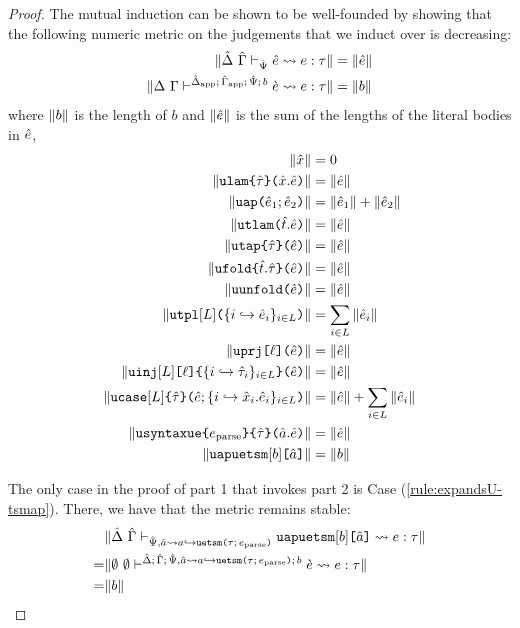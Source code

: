 \begin{proof}
The mutual induction can be shown to be well-founded by showing that the following numeric metric on the judgements that we induct over is decreasing:
\begin{align*}
\sizeof{\expandsU{\uDelta}{\uGamma}{\uPsi}{\ue}{e}{\tau}} & = \sizeof{\ue}\\
\sizeof{\cvalidE{\Delta}{\Gamma}{\esceneU{\uDelta_\text{app}}{\uGamma_\text{app}}{\uPsi}{b}}{\ce}{e}{\tau}} & = \sizeof{b}
\end{align*}
where $\sizeof{b}$ is the length of $b$ and $\sizeof{\ue}$ is the sum of the lengths of the literal bodies in $\ue$,
\begin{align*}
\sizeof{\ux} & = 0\\
\sizeof{\aulam{\utau}{\ux}{\ue}} &= \sizeof{\ue}\\
\sizeof{\auap{\ue_1}{\ue_2}} & = \sizeof{\ue_1} + \sizeof{\ue_2}\\
\sizeof{\autlam{\ut}{\ue}} & = \sizeof{\ue}\\
\sizeof{\autap{\ue}{\utau}} & = \sizeof{\ue}\\
\sizeof{\aufold{\ut}{\utau}{\ue}} & = \sizeof{\ue}\\
\sizeof{\auunfold{\ue}} & = \sizeof{\ue}\\
\sizeof{\autpl{\labelset}{\mapschema{\ue}{i}{\labelset}}} & = \sum_{i \in \labelset} \sizeof{\ue_i}\\
\sizeof{\aupr{\ell}{\ue}} & = \sizeof{\ue}\\
\sizeof{\auin{\labelset}{\ell}{\mapschema{\utau}{i}{\labelset}}{\ue}} & = \sizeof{\ue}\\
\sizeof{\aucase{\labelset}{\utau}{\ue}{\mapschemab{\ux}{\ue}{i}{\labelset}}} & = \sizeof{\ue} + \sum_{i \in \labelset} \sizeof{\ue_i}\\
\sizeof{\audefuetsm{\utau}{\eparse}{\tsmv}{\ue}} & = \sizeof{\ue}\\
\sizeof{\autsmap{b}{\tsmv}} & = \sizeof{b}
\end{align*}

The only case in the proof of part 1 that invokes part 2 is Case (\ref{rule:expandsU-tsmap}). There, we have that the metric remains stable: \begin{align*}
 & \sizeof{\expandsU{\uDelta}{\uGamma}{\uPsi, \uShyp{\tsmv}{a}{\tau}{\eparse}}{\autsmap{b}{\tsmv}}{e}{\tau}}\\
=& \sizeof{\cvalidE{\emptyset}{\emptyset}{\esceneU{\uDelta}{\uGamma}{\uPsi, \uShyp{\tsmv}{a}{\tau}{\eparse}}{b}}{\ce}{e}{\tau}}\\
=&\sizeof{b}\end{align*}


\end{proof}
